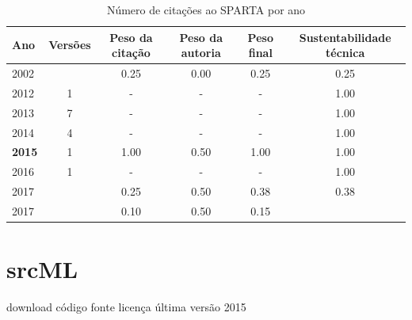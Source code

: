 \begin{table}[H]
\caption{Número de citações ao SPARTA  por ano}
\centering
\begin{tabular}{| l | c | c | c | c | c |}
  \hline
  Ano & Versões & Peso da citação & Peso da autoria & Peso final & Sustentabilidade técnica \\
  \hline
            2002
          &
          
          &
          0.25
          &
          0.00
          &
          0.25
          &
            {\color{red} 0.25}
          \\
\hline
        2012 & 1 & - & - & -
        &
          {\color{blue} 1.00}
        \\
\hline
        2013 & 7 & - & - & -
        &
          {\color{blue} 1.00}
        \\
\hline
        2014 & 4 & - & - & -
        &
          {\color{blue} 1.00}
        \\
\hline
            {\bf 2015}
          &
          1
          &
          1.00
          &
          0.50
          &
          1.00
          &
            {\color{blue} 1.00}
          \\
\hline
        2016 & 1 & - & - & -
        &
          {\color{blue} 1.00}
        \\
\hline
            2017
          &
          
          &
          0.25
          &
          0.50
          &
          0.38
          &
            {\color{red} 0.38}
          \\
            2017
          &
          
          &
          0.10
          &
          0.50
          &
          0.15
          &
          \\
\hline
\end{tabular}
\end{table}



\section{srcML}
\checkmark download
\checkmark código fonte
\checkmark licença
\checkmark última versão 2015


